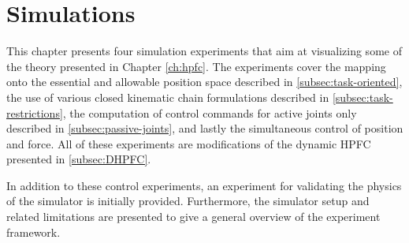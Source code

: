 \chapter{Simulations}\label{ch:results}

This chapter presents four simulation experiments that aim at visualizing some of the theory presented in Chapter \ref{ch:hpfc}. The experiments cover the mapping onto the essential and allowable position space described in \ref{subsec:task-oriented}, the use of various closed kinematic chain formulations described in \ref{subsec:task-restrictions}, the computation of control commands for active joints only described in \ref{subsec:passive-joints}, and lastly the simultaneous control of position and force. All of these experiments are modifications of the dynamic HPFC presented in \ref{subsec:DHPFC}.

In addition to these control experiments, an experiment for validating the physics of the simulator is initially provided. Furthermore, the simulator setup and related limitations are presented to give a general overview of the experiment framework.











